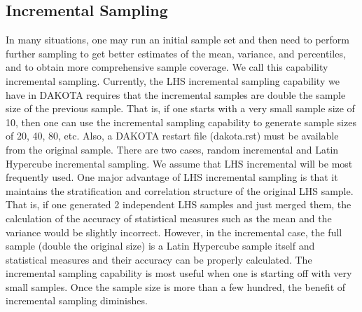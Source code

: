 \subsection{Incremental Sampling}\label{uq:incremental}

In many situations, one may run an initial sample set and then need to
perform further sampling to get better estimates of the mean,
variance, and percentiles, and to obtain more comprehensive sample
coverage.  We call this capability incremental sampling. Currently,
the LHS incremental sampling capability we have in DAKOTA requires that
the incremental samples are double the sample size of the previous
sample.  That is, if one starts with a very small sample size of 10,
then one can use the incremental sampling capability to generate
sample sizes of 20, 40, 80, etc. Also, a DAKOTA restart file
(dakota.rst) must be available from the original sample. There are two
cases, random incremental and Latin Hypercube incremental sampling.
We assume that LHS incremental will be most frequently used.  One
major advantage of LHS incremental sampling is that it maintains the
stratification and correlation structure of the original LHS sample.
That is, if one generated 2 independent LHS samples and just merged
them, the calculation of the accuracy of statistical measures such as
the mean and the variance would be slightly incorrect.  However, in
the incremental case, the full sample (double the original size) is a
Latin Hypercube sample itself and statistical measures and their
accuracy can be properly calculated.  The incremental sampling
capability is most useful when one is starting off with very small
samples. Once the sample size is more than a few hundred, the benefit
of incremental sampling diminishes.

